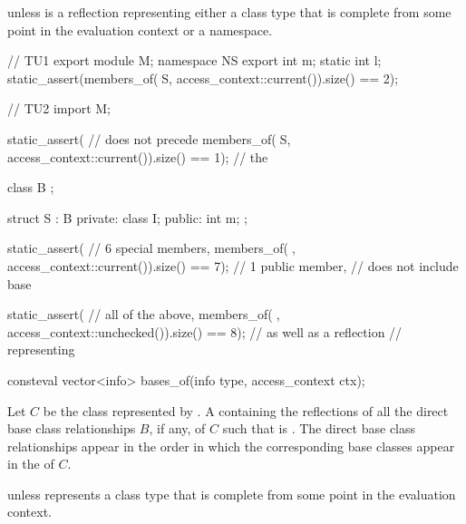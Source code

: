 \begin{itemdescr}
\pnum
\throws
{} unless
 is a reflection representing either
a class type that is complete from some point in the evaluation context
or a namespace.

\pnum
\begin{example}
\begin{codeblock}
// TU1
export module M;
namespace NS {
  export int m;
  static int l;
}
static_assert(members_of(^^NS, access_context::current()).size() == 2);

// TU2
import M;

static_assert(                                                  //  does not precede
  members_of(^^NS, access_context::current()).size() == 1);     // the 

class B {};

struct S : B {
private:
  class I;
public:
  int m;
};

static_assert(                                                  // 6 special members,
  members_of(^^S, access_context::current()).size() == 7);      // 1 public member,
                                                                // does not include base

static_assert(                                                  // all of the above,
  members_of(^^S, access_context::unchecked()).size() == 8);    // as well as a reflection
                                                                // representing 
\end{codeblock}
\end{example}
\end{itemdescr}

%
\begin{itemdecl}
consteval vector<info> bases_of(info type, access_context ctx);
\end{itemdecl}

\begin{itemdescr}
\pnum
\returns
Let $C$ be the class represented by .
A  containing the reflections
of all the direct base class relationships $B$, if any,
of $C$ such that  is .
The direct base class relationships appear in the order in which
the corresponding base classes appear in the  of $C$.

\pnum
\throws
{} unless
 represents a class type
that is complete from some point in the evaluation context.
\end{itemdescr}

